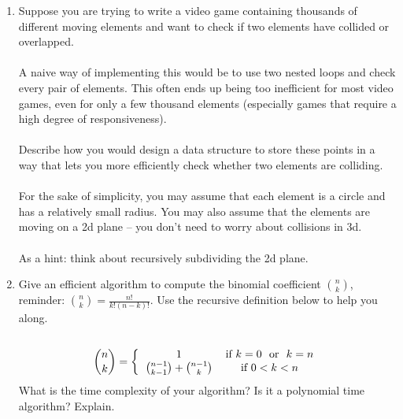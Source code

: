 \documentclass[12pt]{article}
\begin{document}
\begin{enumerate}
\newpage
\item Suppose you are trying to write a video game containing thousands of different moving elements and want to
check if two elements have collided or overlapped.\\\\
A naive way of implementing this would be to use two nested loops and check every pair of elements. This
often ends up being too inefficient for most video games, even for only a few thousand elements (especially
games that require a high degree of responsiveness).\\\\
Describe how you would design a data structure to store these points in a way that lets you more efficiently
check whether two elements are colliding.\\\\
For the sake of simplicity, you may assume that each element is a circle and has a relatively small radius. You
may also assume that the elements are moving on a 2d plane – you don’t need to worry about collisions in 3d.\\\\
As a hint: think about recursively subdividing the 2d plane.
\newpage
\item Give an efficient algorithm to compute the binomial coefficient $\binom{n}{k}$, reminder: $\binom{n}{k} = \frac{n!}{k!(n-k)!}$. 
Use the recursive definition below to help you along. \\\\
\[
\binom{n}{k} = \left\{
\begin{tabular}{cc}
1 & \text{if} $k = 0$ \text{ or } $ k = n$ \\
$\binom{n-1}{k-1} + \binom{n-1}{k}$ & \text{if} $0 < k < n$ \\
\end{tabular}\right.
\]
What is the time complexity of your algorithm? Is it a polynomial time algorithm? Explain.
\end{enumerate} 
\end{document}

